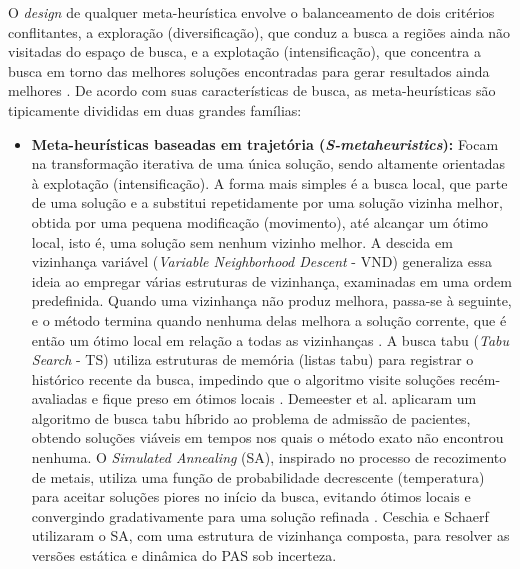 O \textit{design} de qualquer meta-heurística envolve o balanceamento de dois critérios conflitantes, a exploração (diversificação), que conduz a busca a regiões ainda não visitadas do espaço de busca, e a explotação (intensificação), que concentra a busca em torno das melhores soluções encontradas para gerar resultados ainda melhores \cite{talbi2009metaheuristics}. De acordo com suas características de busca, as meta-heurísticas são tipicamente divididas em duas grandes famílias:

\begin{itemize}
    \item \textbf{Meta-heurísticas baseadas em trajetória (\textit{S-metaheuristics}):} Focam na transformação iterativa de uma única solução, sendo altamente orientadas à explotação (intensificação). A forma mais simples é a busca local, que parte de uma solução e a substitui repetidamente por uma solução vizinha melhor, obtida por uma pequena modificação (movimento), até alcançar um ótimo local, isto é, uma solução sem nenhum vizinho melhor. A descida em vizinhança variável (\textit{Variable Neighborhood Descent} - VND) generaliza essa ideia ao empregar várias estruturas de vizinhança, examinadas em uma ordem predefinida. Quando uma vizinhança não produz melhora, passa-se à seguinte, e o método termina quando nenhuma delas melhora a solução corrente, que é então um ótimo local em relação a todas as vizinhanças \cite{talbi2009metaheuristics}. A busca tabu (\textit{Tabu Search} - TS) utiliza estruturas de memória (listas tabu) para registrar o histórico recente da busca, impedindo que o algoritmo visite soluções recém-avaliadas e fique preso em ótimos locais \cite{talbi2009metaheuristics}. Demeester et al. \cite{demeester2010hybrid} aplicaram um algoritmo de busca tabu híbrido ao problema de admissão de pacientes, obtendo soluções viáveis em tempos nos quais o método exato não encontrou nenhuma. O \textit{Simulated Annealing} (SA), inspirado no processo de recozimento de metais, utiliza uma função de probabilidade decrescente (temperatura) para aceitar soluções piores no início da busca, evitando ótimos locais e convergindo gradativamente para uma solução refinada \cite{talbi2009metaheuristics}. Ceschia e Schaerf \cite{ceschia2012modeling} utilizaram o SA, com uma estrutura de vizinhança composta, para resolver as versões estática e dinâmica do PAS sob incerteza.


\end{itemize}

